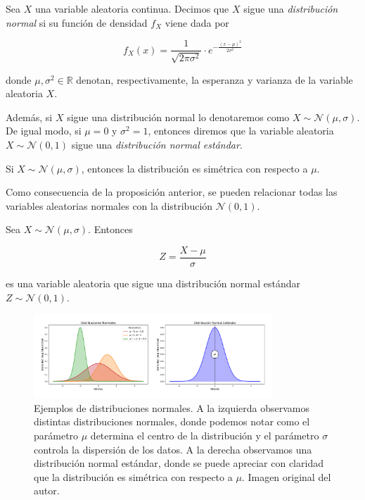 \begin{definicion}
    Sea $X$ una variable aleatoria continua. Decimos que $X$ sigue una \emph{distribución normal} si su función de densidad $f_X$ viene dada por

    \[ f_X(x) = \frac{1}{\sqrt{2\pi \sigma^2}} \cdot e^{-\frac{{(x - \mu)}^2}{2\sigma^2}} \]

    donde $\mu, \sigma^2 \in \mathbb{R}$ denotan, respectivamente, la esperanza y varianza de la variable aleatoria $X$.\newline

    Además, si $X$ sigue una distribución normal lo denotaremos como $X \sim \mathcal{N}(\mu,\sigma)$. De igual modo, si $\mu = 0$ y $\sigma^2=1$, entonces diremos que la variable aleatoria $X \sim \mathcal{N}(0,1)$ sigue una \emph{distribución normal estándar}.\newline
\end{definicion}

\begin{proposicion}
    Si $X \sim \mathcal{N}(\mu,\sigma)$, entonces la distribución es simétrica con respecto a $\mu$.\newline
\end{proposicion}

Como consecuencia de la proposición anterior, se pueden relacionar todas las variables aleatorias normales con la distribución $\mathcal{N}(0,1)$.\newline

\begin{proposicion}
    Sea $X \sim \mathcal{N}(\mu,\sigma)$. Entonces
    
    \[ Z = \frac{X-\mu}{\sigma} \]

    es una variable aleatoria que sigue una distribución normal estándar $Z \sim\mathcal{N}(0,1)$.\newline
\end{proposicion}

\begin{figure}[h]
    \centering
    \includegraphics[width=0.8\textwidth]{img/distribuciones-normales.png}
    \caption[Ejemplos de distribuciones normales.] {Ejemplos de distribuciones normales. A la izquierda observamos distintas distribuciones normales, donde podemos notar como el parámetro $\mu$ determina el centro de la distribución y el parámetro $\sigma$ controla la dispersión de los datos. A la derecha observamos una distribución normal estándar, donde se puede apreciar con claridad que la distribución es simétrica con respecto a $\mu$. Imagen original del autor.}\label{fig:distribuciones-normales}
\end{figure}

